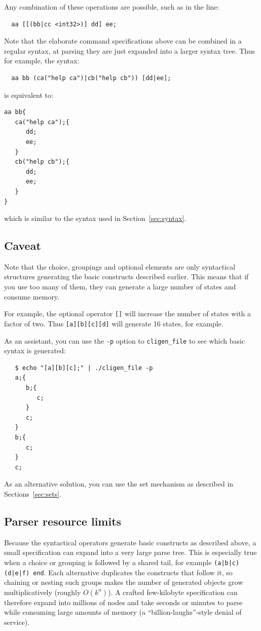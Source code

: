 \documentclass[a4paper, 10pt] {article}
\begin{document}
Any combination of these operations are possible, such as in the line:
\begin{verbatim}
  aa [[(bb|cc <int32>)] dd] ee;
\end{verbatim}

Note that the elaborate command specifications above can be combined
in a regular syntax, at parsing they are just expanded into a larger
syntax tree. 
Thus for example, the syntax:
\begin{verbatim}
  aa bb (ca("help ca")|cb("help cb")) [dd|ee];
\end{verbatim}
is equivalent to:
\begin{verbatim}
aa bb{
   ca("help ca");{
      dd;
      ee;
   }
   cb("help cb");{
      dd;
      ee;
   }
}
\end{verbatim}
which is similar to the syntax used in Section~\ref{sec:syntax}.

\subsection{Caveat}

Note that the choice, groupings and optional elements are only
syntactical structures generating the basic constructs described
earlier. This means that if you use too many of them, they can
generate a large number of states and consume memory.

For example, the optional operator {\tt []} will increase the number of states with a
factor of two. Thus {\tt [a][b][c][d]} will generate 16 states, for
example.

As an assistant, you can use the {\tt -p} option to {\tt cligen\_file} to see which basic syntax is generated:
\begin{verbatim}
   $ echo "[a][b][c];" | ./cligen_file -p
   a;{
      b;{
         c;
      }
      c;
   }
   b;{
      c;
   }
   c;
\end{verbatim}

As an alternative solution, you can use the set mechanism as described in Sections~\ref{sec:sets}.

\subsection{Parser resource limits}
\label{sec:parselimits}

Because the syntactical operators generate basic constructs as described
above, a small specification can expand into a very large parse tree. This
is especially true when a choice or grouping is followed by a shared tail,
for example {\tt (a|b|c) (d|e|f) end}. Each alternative duplicates the
constructs that follow it, so chaining or nesting such groups makes the
number of generated objects grow multiplicatively (roughly $O(k^n)$). A
crafted few-kilobyte specification can therefore expand into millions of
nodes and take seconds or minutes to parse while consuming large amounts of
memory (a ``billion-laughs''-style denial of service).
\end{document}
